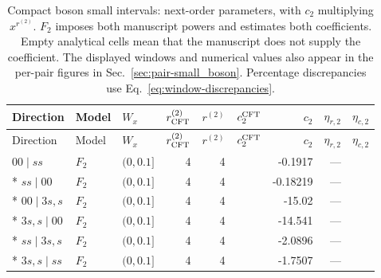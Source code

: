 \begingroup\setlength{\tabcolsep}{2pt}
\begin{longtable}{lllrrrrrr}
\caption{Compact boson small intervals: next-order parameters, with $c_2$ multiplying $x^{r^{(2)}}$. $F_2$ imposes both manuscript powers and estimates both coefficients. Empty analytical cells mean that the manuscript does not supply the coefficient. The displayed windows and numerical values also appear in the per-pair figures in Sec.~\ref{sec:pair-small_boson}. Percentage discrepancies use Eq.~\eqref{eq:window-discrepancies}.}
\label{tab:window-small_boson-second}\\\toprule
Direction & Model & $W_x$ & $r^{(2)}_{\rm CFT}$ & $r^{(2)}$ & $c_2^{\rm CFT}$ & $c_2$ & $\eta_{r,2}$ & $\eta_{c,2}$\\\midrule
\endfirsthead
\toprule
Direction & Model & $W_x$ & $r^{(2)}_{\rm CFT}$ & $r^{(2)}$ & $c_2^{\rm CFT}$ & $c_2$ & $\eta_{r,2}$ & $\eta_{c,2}$\\\midrule
\endhead
\bottomrule\endfoot
$00\mid ss$ & $F_2$ & $(0,0.1]$ & 4 & 4 &  & -0.1917 & --- & \\*
$ss\mid 00$ & $F_2$ & $(0,0.1]$ & 4 & 4 &  & -0.18219 & --- & \\*
$00\mid 3s,s$ & $F_2$ & $(0,0.1]$ & 4 & 4 &  & -15.02 & --- & \\*
$3s,s\mid 00$ & $F_2$ & $(0,0.1]$ & 4 & 4 &  & -14.541 & --- & \\*
$ss\mid 3s,s$ & $F_2$ & $(0,0.1]$ & 4 & 4 &  & -2.0896 & --- & \\*
$3s,s\mid ss$ & $F_2$ & $(0,0.1]$ & 4 & 4 &  & -1.7507 & --- & \\
\end{longtable}
\endgroup
